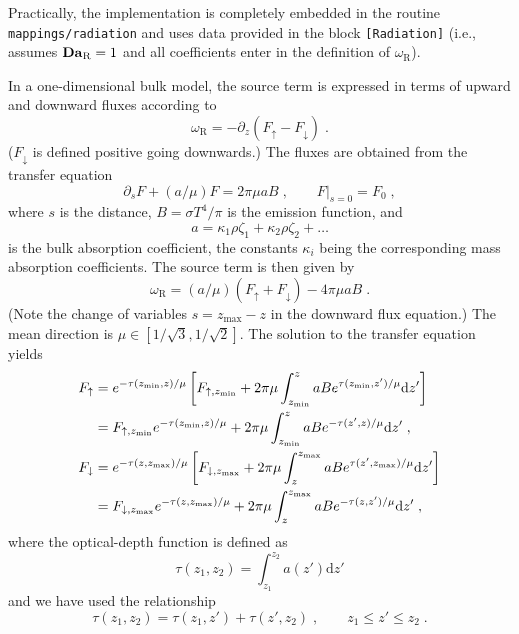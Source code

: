 Practically, the implementation is completely embedded in the routine {\tt mappings/radiation} and uses data provided in the block \texttt{[Radiation]} (i.e., assumes $\mathrm{\bf Da}_\mathrm{R}=1$ and all coefficients enter in the definition of $\omega_\mathrm{R}$). 

In a one-dimensional bulk model, the source term is expressed in terms of upward and downward fluxes according to
\begin{equation}
    \omega_\mathrm{R}=-\partial_z(F_\uparrow -F_\downarrow) \;.
\end{equation}
($F_\downarrow$ is defined positive going downwards.) The fluxes are obtained from the transfer equation
\begin{equation}
    \partial_s F+(a/\mu) F = 2\pi\mu a B\;,\qquad F|_{s=0}=F_0 \;,
\end{equation}
where $s$ is the distance, $B=\sigma T^4/\pi$ is the emission function, and 
\begin{equation}
    a = \kappa_1 \rho \zeta_1 + \kappa_2 \rho \zeta_2 + \ldots
\end{equation}
is the bulk absorption coefficient, the constants $\kappa_i$ being the corresponding mass absorption coefficients. The source term is then given by
\begin{equation}
    \omega_\mathrm{R}=(a/\mu) (F_\uparrow +F_\downarrow) - 4\pi\mu a B \;.
\end{equation}
(Note the change of variables $s=z_\mathrm{max}-z$ in the downward flux equation.) The mean direction is $\mu\in[1/\sqrt{3},1/\sqrt{2}]$. The solution to the transfer equation yields
\begin{subequations}
    \begin{align}
        F_\uparrow &= e^{-\tau(z_\mathrm{min},z)/\mu}\left[ F_{\uparrow,z_\mathrm{min}} + 2\pi\mu\int_{z_\mathrm{min}}^z a B e^{\tau(z_\mathrm{min},z')/\mu}\mathrm{d}z'\right]\notag \\
        &= F_{\uparrow,z_\mathrm{min}}e^{-\tau(z_\mathrm{min},z)/\mu}+ 2\pi\mu\int_{z_\mathrm{min}}^z a B e^{-\tau(z',z)/\mu}\mathrm{d}z' \;,\\
        F_\downarrow &= e^{-\tau(z,z_\mathrm{max})/\mu}\left[ F_{\downarrow,z_\mathrm{max}} + 2\pi\mu\int_z^{z_\mathrm{max}} a B e^{\tau(z',z_\mathrm{max})/\mu}\mathrm{d}z'\right]\notag \\
        &=F_{\downarrow,z_\mathrm{max}}e^{-\tau(z,z_\mathrm{max})/\mu} + 2\pi\mu\int_z^{z_\mathrm{max}} a B e^{-\tau(z,z')/\mu}\mathrm{d}z'\;,
    \end{align}
\end{subequations}
where the optical-depth function is defined as
\begin{equation}
    \tau(z_1, z_2) = \int_{z_1}^{z_2}a(z')\mathrm{d} z'
\end{equation}
and we have used the relationship
\begin{equation}
    \tau(z_1, z_2) = \tau(z_1, z') + \tau(z', z_2)\;,\qquad z_1\le z'\le z_2 \;.
\end{equation}

